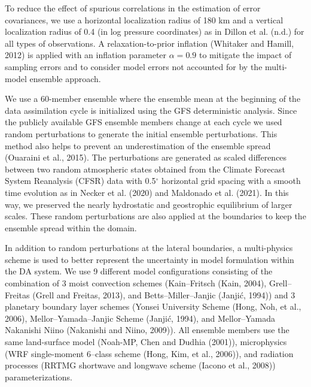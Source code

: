\documentclass[final,5p,times,twocolumn,authoryear]{elsarticle} %
\begin{document}
To reduce the effect of spurious correlations in the estimation of error covariances, we use a horizontal localization radius of 180 km and a vertical localization radius of 0.4 (in log pressure coordinates) as in Dillon et al. (n.d.) for all types of observations.
A relaxation-to-prior inflation (Whitaker and Hamill, 2012) is applied with an inflation parameter \(\alpha=0.9\) to mitigate the impact of sampling errors and to consider model errors not accounted for by the multi-model ensemble approach.

We use a 60-member ensemble where the ensemble mean at the beginning of the data assimilation cycle is initialized using the GFS deterministic analysis. Since the publicly available GFS ensemble members change at each cycle we used random perturbations to generate the initial ensemble perturbations. This method also helps to prevent an underestimation of the ensemble spread (Ouaraini et al., 2015). The perturbations are generated as scaled differences between two random atmospheric states obtained from the Climate Forecast System Reanalysis (CFSR) data with 0.5\(^{\circ}\) horizontal grid spacing with a smooth time evolution as in Necker et al. (2020) and Maldonado et al. (2021). In this way, we preserved the nearly hydrostatic and geostrophic equilibrium of larger scales. These random perturbations are also applied at the boundaries to keep the ensemble spread within the domain.

In addition to random perturbations at the lateral boundaries, a multi-physics scheme is used to better represent the uncertainty in model formulation within the DA system. We use 9 different model configurations consisting of the combination of 3 moist convection schemes (Kain--Fritsch (Kain, 2004), Grell--Freitas (Grell and Freitas, 2013), and Betts--Miller--Janjic (Janjić, 1994)) and 3 planetary boundary layer schemes (Yonsei University Scheme (Hong, Noh, et al., 2006), Mellor--Yamada--Janjic Scheme (Janjić, 1994), and Mellor--Yamada Nakanishi Niino (Nakanishi and Niino, 2009)). All ensemble members use the same land-surface model (Noah-MP, Chen and Dudhia (2001)), microphysics (WRF single-moment 6--class scheme (Hong, Kim, et al., 2006)), and radiation processes (RRTMG shortwave and longwave scheme (Iacono et al., 2008)) parameterizations.
\end{document}
